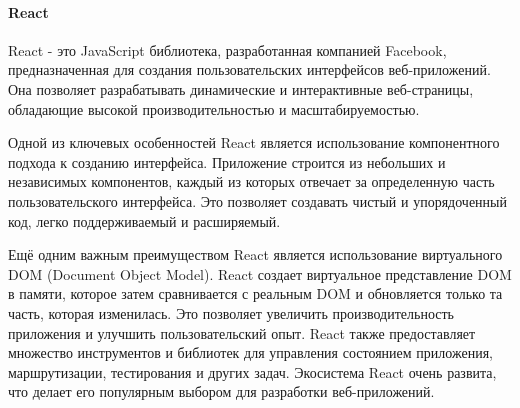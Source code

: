 \paragraph{React}

React - это JavaScript библиотека, разработанная компанией Facebook, предназначенная для создания пользовательских интерфейсов веб-приложений. Она позволяет разрабатывать динамические и интерактивные веб-страницы, обладающие высокой производительностью и масштабируемостью.

Одной из ключевых особенностей React является использование компонентного подхода к созданию интерфейса. Приложение строится из небольших и независимых компонентов, каждый из которых отвечает за определенную часть пользовательского интерфейса. Это позволяет создавать чистый и упорядоченный код, легко поддерживаемый и расширяемый.

Ещё одним важным преимуществом React является использование виртуального DOM (Document Object Model). React создает виртуальное представление DOM в памяти, которое затем сравнивается с реальным DOM и обновляется только та часть, которая изменилась. Это позволяет увеличить производительность приложения и улучшить пользовательский опыт.
React также предоставляет множество инструментов и библиотек для управления состоянием приложения, маршрутизации, тестирования и других задач. Экосистема React очень развита, что делает его популярным выбором для разработки веб-приложений.

